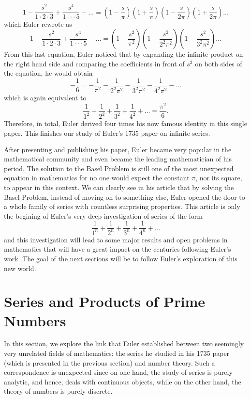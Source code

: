 $$1 - \frac{s^2}{1\cdot 2 \cdot 3} + \frac{s^4}{1\cdot \cdot \cdot 5} - \dots = \left(1 - \frac{s}{\pi}\right)\left(1 + \frac{s}{\pi}\right)\left(1 - \frac{s}{2\pi}\right)\left(1 + \frac{s}{2\pi}\right)\dots$$
which Euler rewrote as
\begin{equation}
    1 - \frac{s^2}{1\cdot 2 \cdot 3} + \frac{s^4}{1\cdot \cdot \cdot 5} - \dots = \left(1 - \frac{s^2}{\pi^2}\right)\left(1 - \frac{s^2}{2^2\pi^2}\right)\left(1 - \frac{s^2}{3^2\pi^2}\right)\dots
\end{equation}
From this last equation, Euler noticed that by expanding the infinite product on the right hand side and comparing the coefficients in front of $s^2$ on both sides of the equation, he would obtain
$$-\frac{1}{6} = -\frac{1}{\pi^2}-\frac{1}{2^2\pi^2}-\frac{1}{3^2\pi^2}-\frac{1}{4^2\pi^2}-\dots$$
which is again equivalent to
$$\frac{1}{1^2} + \frac{1}{2^2} + \frac{1}{3^2} + \frac{1}{4^2} + \dots = \frac{\pi^2}{6}.$$
Therefore, in total, Euler derived four times his now famous identity in this single paper. This finishes our study of Euler's 1735 paper on infinite series. 

After presenting and publishing his paper, Euler became very popular in the mathematical community and even became the leading mathematician of his period. The solution to the Basel Problem is still one of the most unexpected equation in mathematics for no one would expect the constant $\pi$, nor its square, to appear in this context. We can clearly see in his article that by solving the Basel Problem, instead of moving on to something else, Euler opened the door to a whole family of series with countless surprising properties. This article is only the begining of Euler's very deep investigation of series of the form
$$\frac{1}{1^n} + \frac{1}{2^n} + \frac{1}{3^n} + \frac{1}{4^n} + \dots$$
and this investigation will lead to some major results and open problems in mathematics that will have a great impact on the centuries following Euler's work. The goal of the next sections will be to follow Euler's exploration of this new world. 

\section{Series and Products of Prime Numbers}

In this section, we explore the link that Euler established between two seemingly very unrelated fields of mathematics: the series he studied in his 1735 paper (which is presented in the previous section) and number theory. Such a correspondence is unexpected since on one hand, the study of series is purely analytic, and hence, deals with continuous objects, while on the other hand, the theory of numbers is purely discrete.

